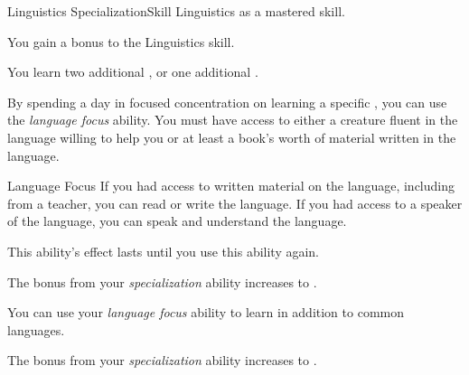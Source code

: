     \begin{feat}{Linguistics Specialization}{Skill}
        \featpre Linguistics as a mastered skill.

         You gain a  bonus to the Linguistics skill.

         You learn two additional , or one additional .

         By spending a day in focused concentration on learning a specific , you can use the \textit{language focus} ability.
        You must have access to either a creature fluent in the language willing to help you or at least a book's worth of material written in the language.
        \begin{freeability}{Language Focus}
            If you had access to written material on the language, including from a teacher, you can read or write the language.
            If you had access to a speaker of the language, you can speak and understand the language.

            This ability's effect lasts until you use this ability again.
        \end{freeability}

         The bonus from your \textit{specialization} ability increases to .

         You can use your \textit{language focus} ability to learn  in addition to common languages.

         The bonus from your \textit{specialization} ability increases to .
    \end{feat}

